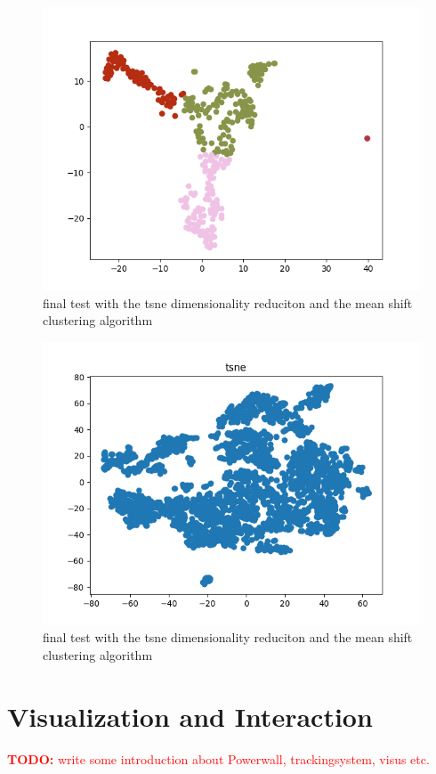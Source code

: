 \documentclass[journal]{vgtc}       %
\newcommand{\todo}[1]{\textcolor{red}{\textbf{TODO:} #1}}
\begin{document}
\begin{figure}[tb]
	\begin{center}
		\includegraphics[width=.75\linewidth]{MS-tsne.png}
	\end{center}
	\caption{\label{fig:tsne} final test with the tsne dimensionality reduciton and the mean shift clustering algorithm }
\end{figure}

\begin{figure}[tb]
	\begin{center}
		\includegraphics[width=.75\linewidth]{tsneFull.png}
	\end{center}
	\caption{\label{fig:tsnef} final test with the tsne dimensionality reduciton and the mean shift clustering algorithm }
\end{figure}

\section{Visualization and Interaction}
\todo{write some introduction about Powerwall, trackingsystem, visus etc.}
\end{document}
